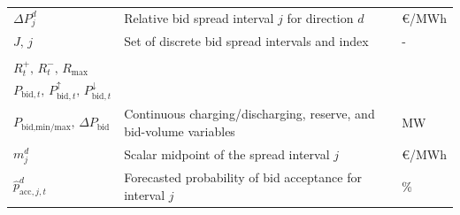 \begin{longtable}{@{}>{\raggedright\arraybackslash}p{} >{\raggedright\arraybackslash}p{} >{\raggedright\arraybackslash}p{}@{}}
    $\Delta P_{j}^{d}$                                                                                                                                                                                                                                                                                        & Relative bid spread interval $j$ for direction $d$                                                                                 & €/MWh                               \\
    $J,\,j$                                                                                                                                                                                                                                                                                                   & Set of discrete bid spread intervals and index                                                                                     & -                                   \\
    \begin{tabular}[t]{@{}l@{}}$P_{\text{charge},t},\,P_{\text{discharge},t}$\\$R_t^{+},\,R_t^{-},\,R_{\max}$\\$P_{\text{bid},t},\,P_{\text{bid},t}^{\uparrow},\,P_{\text{bid},t}^{\downarrow}$\\$P_{\text{bid,min/max}},\,\Delta P_{\text{bid}}$\end{tabular}                                                                  & Continuous charging/discharging, reserve, and bid-volume variables                                                                & MW                                  \\
    $m_{j}^{d}$                                                                                                                                                                                                                                                                                               & Scalar midpoint of the spread interval $j$                                                                                         & €/MWh                               \\
    $\hat{p}_{\text{acc}, j, t}^{d}$                                                                                                                                                                                                                                                                          & Forecasted probability of bid acceptance for interval $j$                                                                          & \%                                  \\

\end{longtable}
